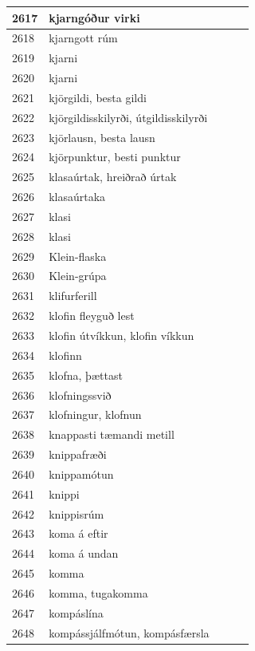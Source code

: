 \begin{longtable}{p{}|p{}|p{}|p{}|p{}}
\hline
2617 & kjarngóður virki &  &  &  \\
\hline
2618 & kjarngott rúm &  &  &  \\
\hline
2619 & kjarni &  &  &  \\
\hline
2620 & kjarni &  &  &  \\
\hline
2621 & kjörgildi, besta gildi &  &  &  \\
\hline
2622 & kjörgildisskilyrði, útgildisskilyrði &  &  &  \\
\hline
2623 & kjörlausn, besta lausn &  &  &  \\
\hline
2624 & kjörpunktur, besti punktur &  &  &  \\
\hline
2625 & klasaúrtak, hreiðrað úrtak &  &  &  \\
\hline
2626 & klasaúrtaka &  &  &  \\
\hline
2627 & klasi &  &  &  \\
\hline
2628 & klasi &  &  &  \\
\hline
2629 & Klein-flaska &  &  &  \\
\hline
2630 & Klein-grúpa &  &  &  \\
\hline
2631 & klifurferill &  &  &  \\
\hline
2632 & klofin fleyguð lest &  &  &  \\
\hline
2633 & klofin útvíkkun, klofin víkkun &  &  &  \\
\hline
2634 & klofinn &  &  &  \\
\hline
2635 & klofna, þættast &  &  &  \\
\hline
2636 & klofningssvið &  &  &  \\
\hline
2637 & klofningur, klofnun &  &  &  \\
\hline
2638 & knappasti tæmandi metill &  &  &  \\
\hline
2639 & knippafræði &  &  &  \\
\hline
2640 & knippamótun &  &  &  \\
\hline
2641 & knippi &  &  &  \\
\hline
2642 & knippisrúm &  &  &  \\
\hline
2643 & koma á eftir &  &  &  \\
\hline
2644 & koma á undan &  &  &  \\
\hline
2645 & komma &  &  &  \\
\hline
2646 & komma, tugakomma &  &  &  \\
\hline
2647 & kompáslína &  &  &  \\
\hline
2648 & kompássjálfmótun, kompásfærsla &  &  &  \\

\end{longtable}
